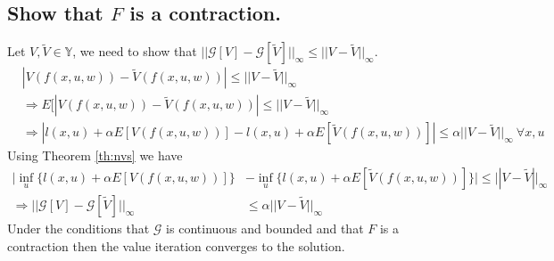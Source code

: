 \subsection{Show that $F$ is a contraction.}
\label{sec:showfcontraction}
Let $V,\tilde{V}\in\mathbb{Y}$, we need to show that $||\mathcal{G}[V]-\mathcal{G}[\tilde{V}]||_\infty \leq ||V-\tilde{V}||_\infty$.
\begin{align*}
&|V(f(x,u,w)) - \tilde{V}(f(x,u,w))| \leq ||V-\tilde{V}||_\infty \\
&\Rightarrow E[|V(f(x,u,w)) - \tilde{V}(f(x,u,w))| \leq ||V-\tilde{V}||_\infty \\
&\Rightarrow |l(x,u)+\alpha E[V(f(x,u,w))] - l(x,u)+\alpha E[\tilde{V}(f(x,u,w))]| \leq \alpha||V-\tilde{V}||_\infty ~\forall x,u
\end{align*}
Using Theorem \ref{th:nvs} we have
\begin{align*}
|\inf_u\{l(x,u)+\alpha E[V(f(x,u,w))]\} &- \inf_u\{l(x,u)+\alpha E[\tilde{V}(f(x,u,w))]\}| \leq ||V-\tilde{V}||_\infty \\
\Rightarrow ||\mathcal{G}[V]-\mathcal{G}[\tilde{V}]||_\infty &\leq \alpha||V-\tilde{V}||_\infty
\end{align*}
Under the conditions that $\mathcal{G}$ is continuous and bounded and that $F$ is a contraction then the value iteration converges to the solution.

